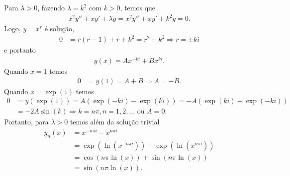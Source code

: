 \documentclass[a4paper,12pt, leqno, answers]{exam}
\begin{document}
\begin{questions}
\begin{parts}
\begin{solution}
            Para $\lambda > 0$, fazendo $\lambda = k^2$ com $k > 0$, temos que
            \begin{align*}
                x^2 y'' + x y' + \lambda y = x^2 y'' + x y' + k^2 y = 0.
            \end{align*}
            Logo, $y = x^r$ \'{e} solu\c{c}\~{a}o,
            \begin{align*}
                0 &= r (r - 1) + r + k^2 = r^2 + k^2 \Rightarrow r = \pm k i
            \end{align*}
            e portanto
            \begin{align*}
                y(x) = A x^{-k i} + B x^{k i}.
            \end{align*}
            Quando $x = 1$ temos
            \begin{align*}
                0 &= y(1) = A + B \Rightarrow A = -B.
            \end{align*}
            Quando $x = \exp(1)$ temos
            \begin{align*}
                0 &= y(\exp(1)) = A (\exp(-k i) - \exp(k i)) = - A (\exp(k i) - \exp(-k i)) \\
                &= -2 A \sin(k) \Rightarrow k = n \pi, n = 1, 2, \ldots \text{ ou } A = 0.
            \end{align*}
            Portanto, para $\lambda > 0$ temos al\'{e}m da solu\c{c}\~{a}o trivial
            \begin{align*}
                y_n(x) &= x^{- n \pi i} - x^{n \pi i} \\
                &= \exp(\ln(x^{- n \pi i})) - \exp(\ln(x^{n \pi i})) \\
                &= \cos(n \pi \ln(x)) + \sin(n \pi \ln(x)) \\
                &= \sin(n \pi \ln(x)).
            \end{align*}


\end{solution}
\end{parts}
\end{questions}
\end{document}

